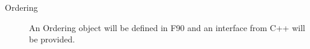 


\begin{description}

\item [Ordering] An Ordering object will be defined in F90 and an interface
from C++ will be provided.

\end{description}



